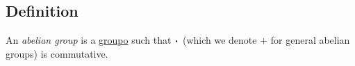 \subsection{Definition}\label{groupdefinition}

An \emph{abelian group} is a \hyperref[groupodefinition]{groupo} such that $\LargerCdot$ (which we denote $+$ for general abelian groups) is commutative.\newline